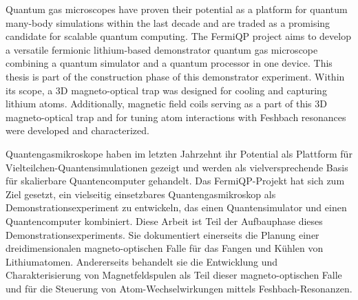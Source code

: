 Quantum gas microscopes have proven their potential as a platform for quantum many-body simulations within the last decade and are traded as a promising candidate for scalable quantum computing. The FermiQP project aims to develop a versatile fermionic lithium-based demonstrator quantum gas microscope combining a quantum simulator and a quantum processor in one device. This thesis is part of the construction phase of this demonstrator experiment. Within its scope, a 3D magneto-optical trap was designed for cooling and capturing lithium atoms. Additionally, magnetic field coils serving as a part of this 3D magneto-optical trap and for tuning atom interactions with Feshbach resonances were developed and characterized.
\vspace{2cm}

Quantengasmikroskope haben im letzten Jahrzehnt ihr Potential als Plattform für Vielteilchen-Quantensimulationen gezeigt und werden als vielversprechende Basis für skalierbare Quantencomputer gehandelt. Das FermiQP-Projekt hat sich zum Ziel gesetzt, ein vielseitig einsetzbares Quantengasmikroskop als Demonstrationsexperiment zu entwickeln, das einen Quantensimulator und einen Quantencomputer kombiniert. Diese Arbeit ist Teil der Aufbauphase dieses Demonstrationsexperiments. Sie dokumentiert einerseits die Planung einer dreidimensionalen magneto-optischen Falle für das Fangen und Kühlen von Lithiumatomen. Andererseits behandelt sie die Entwicklung und Charakterisierung von Magnetfeldspulen als Teil dieser magneto-optischen Falle und für die Steuerung von Atom-Wechselwirkungen mittels Feshbach-Resonanzen.